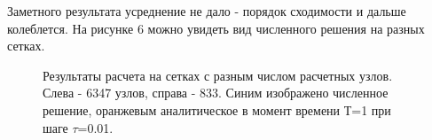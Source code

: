 \documentclass[14pt]{article}
\begin{document}
\newpage
Заметного результата усреднение не дало - порядок сходимости и дальше колеблется. На рисунке 6 можно увидеть вид численного решения на разных сетках.
\begin{figure}[!h!]
\caption{Результаты расчета на сетках с разным числом расчетных узлов. Слева - 6347 узлов, справа - 833. Синим изображено численное решение, оранжевым аналитическое в момент времени Т=1 при шаге $\tau$=0.01.}
\end{figure}
\end{document}
